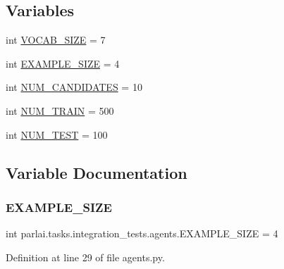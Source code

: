 \subsection*{Variables}
\begin{DoxyCompactItemize}
\item 
int \hyperlink{namespaceparlai_1_1tasks_1_1integration__tests_1_1agents_acce0481273f02014fb577733cfa8f2b7}{V\+O\+C\+A\+B\+\_\+\+S\+I\+ZE} = 7
\item 
int \hyperlink{namespaceparlai_1_1tasks_1_1integration__tests_1_1agents_a1a9a556c90b625c74c9afd0a1a82ca3c}{E\+X\+A\+M\+P\+L\+E\+\_\+\+S\+I\+ZE} = 4
\item 
int \hyperlink{namespaceparlai_1_1tasks_1_1integration__tests_1_1agents_a43719015a313515dcd768b12491ec3a1}{N\+U\+M\+\_\+\+C\+A\+N\+D\+I\+D\+A\+T\+ES} = 10
\item 
int \hyperlink{namespaceparlai_1_1tasks_1_1integration__tests_1_1agents_abc5a5ed634c3ec4aa371a49b883d37a1}{N\+U\+M\+\_\+\+T\+R\+A\+IN} = 500
\item 
int \hyperlink{namespaceparlai_1_1tasks_1_1integration__tests_1_1agents_ad6197fa4ad385bde5542da3aa644ad8b}{N\+U\+M\+\_\+\+T\+E\+ST} = 100
\end{DoxyCompactItemize}


\subsection{Variable Documentation}
\mbox{\label{namespaceparlai_1_1tasks_1_1integration__tests_1_1agents_a1a9a556c90b625c74c9afd0a1a82ca3c}} 
\subsubsection{\texorpdfstring{E\+X\+A\+M\+P\+L\+E\+\_\+\+S\+I\+ZE}{EXAMPLE\_SIZE}}
{\footnotesize\ttfamily int parlai.\+tasks.\+integration\+\_\+tests.\+agents.\+E\+X\+A\+M\+P\+L\+E\+\_\+\+S\+I\+ZE = 4}



Definition at line 29 of file agents.\+py.

